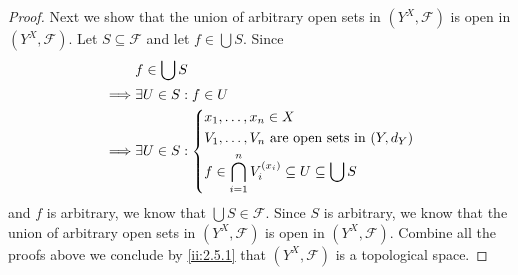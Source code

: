 \begin{proof}
  Next we show that the union of arbitrary open sets in \((Y^X, \mathcal{F})\) is open in \((Y^X, \mathcal{F})\).
  Let \(S \subseteq \mathcal{F}\) and let \(f \in \bigcup S\).
  Since
  \begin{align*}
             & f \in \bigcup S                                                                      \\
    \implies & \exists U \in S : f \in U                                                            \\
    \implies & \exists U \in S : \begin{dcases}
                                   x_1, \dots, x_n \in X                              \\
                                   V_1, \dots, V_n \text{ are open sets in } (Y, d_Y) \\
                                   f \in \bigcap_{i = 1}^n V_i^{(x_i)} \subseteq U \subseteq \bigcup S
                                 \end{dcases}
  \end{align*}
  and \(f\) is arbitrary, we know that \(\bigcup S \in \mathcal{F}\).
  Since \(S\) is arbitrary, we know that the union of arbitrary open sets in \((Y^X, \mathcal{F})\) is open in \((Y^X, \mathcal{F})\).
  Combine all the proofs above we conclude by \cref{ii:2.5.1} that \((Y^X, \mathcal{F})\) is a topological space.


\end{proof}
